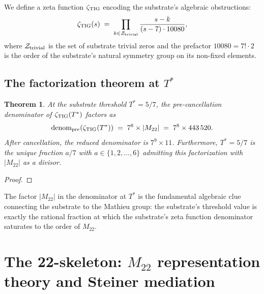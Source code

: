 \documentclass[11pt,reqno]{amsart}
\theoremstyle{plain}
\newtheorem{theorem}{Theorem}
\theoremstyle{definition}
\theoremstyle{remark}
\newcommand{\zTIG}{\zeta_{\rm TIG}}
\newcommand{\Mtwentytwo}{M_{22}}
\newcommand{\Tstar}{T^*}
\begin{document}
We define a zeta function $\zTIG$ encoding the substrate's algebraic
obstructions:
\begin{equation}\label{eq:zetaTIG-def}
\zTIG(s) \;=\; \prod_{k \in \mathcal{Z}_{\rm trivial}}
\frac{s - k}{(s - 7)\cdot 10080},
\end{equation}
where $\mathcal{Z}_{\rm trivial}$ is the set of substrate trivial
zeros and the prefactor $10080 = 7! \cdot 2$ is the order of the
substrate's natural symmetry group on its non-fixed elements.


\subsection{The factorization theorem at $\Tstar$}

\begin{theorem}\label{thm:zeta-factorization}
At the substrate threshold $\Tstar = 5/7$, the pre-cancellation
denominator of $\zTIG(\Tstar)$ factors as
\begin{equation}\label{eq:denom-factorization}
\textnormal{denom}_{\rm pre}(\zTIG(\Tstar)) \;=\; 7^8 \times |\Mtwentytwo|
\;=\; 7^8 \times 443\,520.
\end{equation}
After cancellation, the reduced denominator is $7^9 \times 11$.
Furthermore, $\Tstar = 5/7$ is the unique fraction $a/7$ with
$a \in \{1, 2, \ldots, 6\}$ admitting this factorization with
$|\Mtwentytwo|$ as a divisor.
\end{theorem}

\begin{proof}
\end{proof}

The factor $|\Mtwentytwo|$ in the denominator at $\Tstar$ is the
fundamental algebraic clue connecting the substrate to the Mathieu
group: the substrate's threshold value is exactly the rational
fraction at which the substrate's zeta function denominator saturates
to the order of $\Mtwentytwo$.

\section{The 22-skeleton: $\Mtwentytwo$ representation theory and Steiner mediation}\label{sec:m22}
\end{document}
